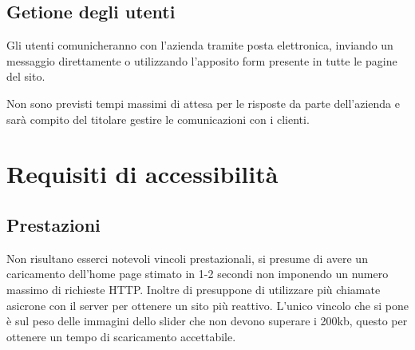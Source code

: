 \documentclass[a4paper,12pt,hidelinks]{report}
\begin{document}
  \subsection{Getione degli utenti}
    Gli utenti comunicheranno con l'azienda tramite posta elettronica, inviando un messaggio direttamente o utilizzando l'apposito form presente in tutte le pagine del sito.
    \par Non sono previsti tempi massimi di attesa per le risposte da parte dell'azienda e sarà compito del titolare gestire le comunicazioni con i clienti.

\section{Requisiti di accessibilità}
  \subsection{Prestazioni}
    Non risultano esserci notevoli vincoli prestazionali, si presume di avere un caricamento dell'home page stimato in 1-2 secondi non imponendo un numero 
    massimo di richieste HTTP.
    Inoltre di presuppone di utilizzare più chiamate asicrone con il server per ottenere un sito più reattivo. L'unico vincolo che si pone è sul peso 
    delle immagini dello slider che non devono superare i 200kb, questo per ottenere un tempo di scaricamento accettabile.
  
\end{document}
